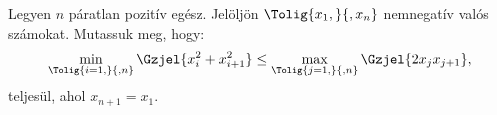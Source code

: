 Legyen $n$ páratlan pozitív egész. Jelöljön $\Tolig{x_{1},}{,x_{n}}$ nemnegatív 
valós számokat. Mutassuk meg, hogy:
$$
\min_{\Tolig{i=1,}{,n}} \Gzjel{ x_{i}^{2}+x_{i+1}^{2}} \le
\max_{\Tolig{j=1,}{,n}} \Gzjel{ 2x_{j}x_{j+1}},
$$
teljesül, ahol $x_{n+1}=x_{1}$.
